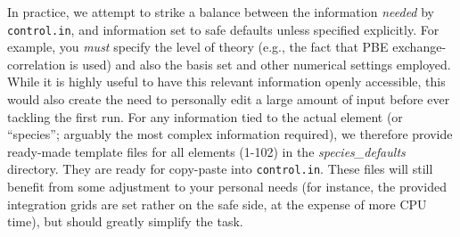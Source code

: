In practice, we attempt to strike a balance
between the information \emph{needed} by \linebreak[4] \texttt{control.in}, and information
set to safe defaults unless specified explicitly. For example, you \emph{must}
specify the level of theory (e.g., the fact that PBE exchange-correlation is
used) and also the basis set and other numerical settings employed. While it is highly useful to
have this relevant information openly accessible, this  
would also create the need to personally edit a large amount of input before ever
tackling the first run. For any information tied to the actual element (or
``species''; arguably the most complex information required), we therefore provide
ready-made template files for all elements (1-102) in the
\emph{species\_defaults} directory. They are ready for copy-paste into
\texttt{control.in}. These files will still benefit from some
adjustment to your personal needs (for instance, the provided integration
grids are set rather on the safe side, at the expense of more CPU time), but
should greatly simplify the task. 

